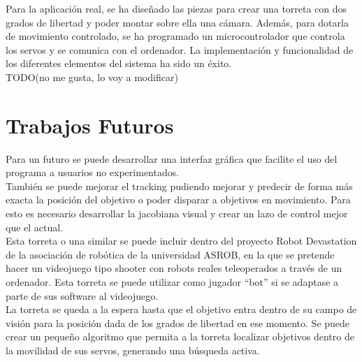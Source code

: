 Para la aplicación real, se ha diseñado las piezas para crear una torreta con dos grados de libertad y poder montar sobre ella una cámara. Además, para dotarla de movimiento controlado, se ha programado un microcontrolador que controla los servos y se comunica con el ordenador. La implementación y funcionalidad de los diferentes elementos del sistema ha sido un éxito.\\

TODO(no me gusta, lo voy a modificar)\\

\newpage


\section{Trabajos Futuros}
Para un futuro se puede desarrollar una interfaz gráfica que facilite el uso del programa a usuarios no experimentados.\\

También se puede mejorar el tracking pudiendo mejorar y predecir de forma más exacta la posición del objetivo o poder disparar a objetivos en movimiento. Para esto es necesario desarrollar la jacobiana visual y crear un lazo de control mejor que el actual.\\

Esta torreta o una similar se puede incluir dentro del proyecto Robot Devastation de la asociación de robótica de la universidad ASROB, en la que se pretende hacer un videojuego tipo shooter con robots reales teleoperados a través de un ordenador. Esta torreta se puede utilizar como jugador “bot” si se adaptase a parte de sus software al videojuego.\\

La torreta se queda a la espera hasta que el objetivo entra dentro de su campo de visión para la posición dada de los grados de libertad en ese momento. Se puede crear un pequeño algoritmo que permita a la torreta localizar objetivos dentro de la movilidad de sus servos, generando una búsqueda activa.\\